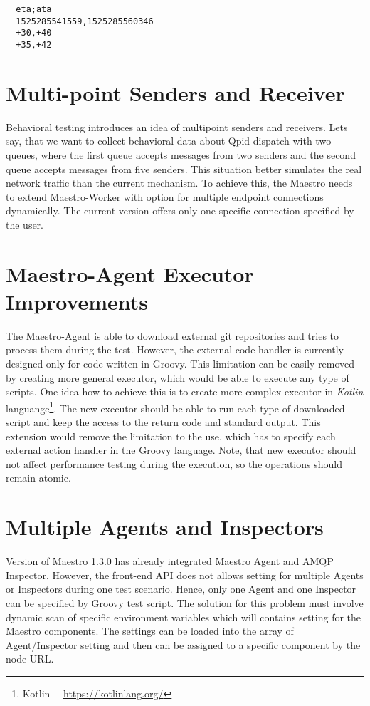 \begin{verbatim}
  eta;ata
  1525285541559,1525285560346
  +30,+40
  +35,+42
\end{verbatim}

\section{Multi-point Senders and Receiver}
Behavioral testing introduces an idea of multipoint senders and receivers. Lets say, that we want to collect behavioral data about Qpid-dispatch with two queues, where the first queue accepts messages from two senders and the second queue accepts messages from five senders. This situation better simulates the real network traffic than the current mechanism. To achieve this, the Maestro needs to extend Maestro-Worker with option for multiple endpoint connections dynamically. The current version offers only one specific connection specified by the user.

\section{Maestro-Agent Executor Improvements}
The Maestro-Agent is able to download external git repositories and tries to process them during the test. However, the external code handler is currently designed only for code written in Groovy. This limitation can be easily removed by creating more general executor, which would be able to execute any type of scripts. One idea how to achieve this is to create more complex executor in \emph{Kotlin} languange\footnote{Kotlin\,---\,\url{https://kotlinlang.org/}}. The new executor should be able to run each type of downloaded script and keep the access to the return code and standard output. This extension would remove the limitation to the use, which has to specify each external action handler in the Groovy language. Note, that new executor should not affect performance testing during the execution, so the operations should remain atomic.

\section{Multiple Agents and Inspectors}
Version of Maestro 1.3.0 has already integrated Maestro Agent and AMQP Inspector. However, the front-end API does not allows setting for multiple Agents or Inspectors during one test scenario. Hence, only one Agent and one Inspector can be specified by Groovy test script. The solution for this problem must involve dynamic scan of specific environment variables which will contains setting for the Maestro components. The settings can be loaded into the array of Agent/Inspector setting and then can be assigned to a specific component by the node URL.

